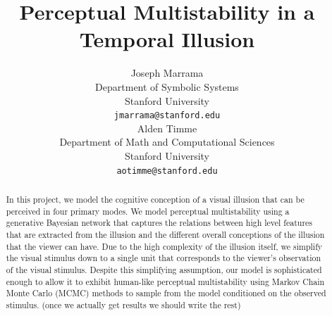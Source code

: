 \documentclass{article} %
\title{Perceptual Multistability in a Temporal Illusion}
\author{
Joseph Marrama \\
Department of Symbolic Systems\\
Stanford University\\
\texttt{jmarrama@stanford.edu} \\
\And
Alden Timme \\
Department of Math and Computational Sciences \\
Stanford University \\
\texttt{aotimme@stanford.edu} \\
}
\begin{document}
\maketitle

\begin{abstract}
In this project, we model the cognitive conception of a visual illusion that can be perceived in four primary modes. 
We model perceptual multistability using a generative Bayesian network that captures the relations between high level features that are extracted from the illusion and the different overall conceptions of the illusion that the viewer can have.
Due to the high complexity of the illusion itself, we simplify the visual stimulus down to a single unit that corresponds to the viewer's observation of the visual stimulus.
Despite this simplifying assumption, our model is sophisticated enough to allow it to exhibit human-like perceptual multistability using Markov Chain Monte Carlo (MCMC) methods to sample from the model conditioned on the observed stimulus. (once we actually get results we should write the rest) 


\end{abstract}



\end{document}
